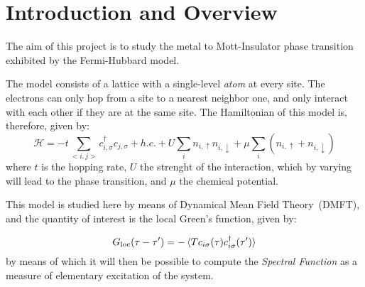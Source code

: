 
\section{Introduction and Overview}

The aim of this project is to study the metal to Mott-Insulator phase transition exhibited by the Fermi-Hubbard model.

The model consists of a lattice with a single-level \textit{atom} at every site. The electrons can only hop from a site to a nearest neighbor one, and only interact with each other if they are at the same site. The Hamiltonian of this model is, therefore, given by:
%
\begin{equation}
\mathcal{H} = -t\sum_{<i,j>}c_{i,\sigma}^\dagger c_{j,\sigma} + h.c.+ U\sum_i n_{i,\uparrow}n_{i,\downarrow} + \mu\sum_i (n_{i,\uparrow} + n_{i,\downarrow})
\end{equation}
%
where $t$ is the hopping rate, $U$ the strenght of the interaction, which by varying will lead to the phase transition, and $\mu$ the chemical potential.

This model is studied here by means of Dynamical Mean Field Theory~(DMFT), and the quantity of interest is the local Green's function, given by:

\begin{equation}\label{orGreen's}
G_{\text{loc}} (\tau - \tau^\prime) = -\braket{Tc_{i\sigma}(\tau)c_{i\sigma}^\dagger(\tau^\prime)} 
\end{equation}
by means of which it will then be possible to compute the \emph{Spectral Function} as a measure of elementary excitation of the system.

